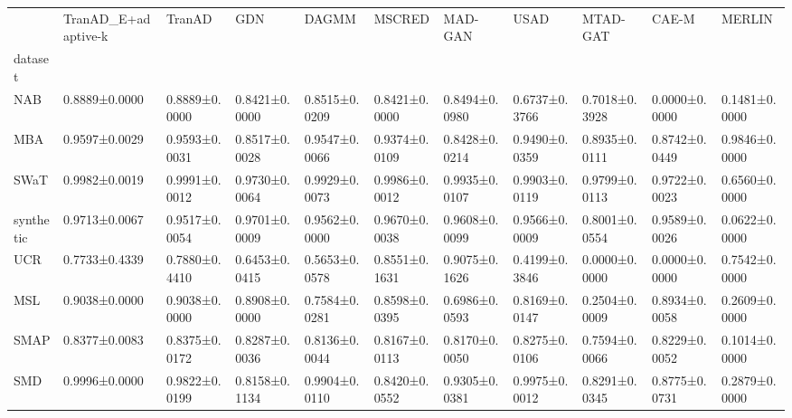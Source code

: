 \begin{tabular}{lllllllllll}
\toprule
 & TranAD_E+adaptive-k & TranAD & GDN & DAGMM & MSCRED & MAD-GAN & USAD & MTAD-GAT & CAE-M & MERLIN \\
dataset &  &  &  &  &  &  &  &  &  &  \\
\midrule
NAB & 0.8889±0.0000 & 0.8889±0.0000 & 0.8421±0.0000 & 0.8515±0.0209 & 0.8421±0.0000 & 0.8494±0.0980 & 0.6737±0.3766 & 0.7018±0.3928 & 0.0000±0.0000 & 0.1481±0.0000 \\
MBA & 0.9597±0.0029 & 0.9593±0.0031 & 0.8517±0.0028 & 0.9547±0.0066 & 0.9374±0.0109 & 0.8428±0.0214 & 0.9490±0.0359 & 0.8935±0.0111 & 0.8742±0.0449 & 0.9846±0.0000 \\
SWaT & 0.9982±0.0019 & 0.9991±0.0012 & 0.9730±0.0064 & 0.9929±0.0073 & 0.9986±0.0012 & 0.9935±0.0107 & 0.9903±0.0119 & 0.9799±0.0113 & 0.9722±0.0023 & 0.6560±0.0000 \\
synthetic & 0.9713±0.0067 & 0.9517±0.0054 & 0.9701±0.0009 & 0.9562±0.0000 & 0.9670±0.0038 & 0.9608±0.0099 & 0.9566±0.0009 & 0.8001±0.0554 & 0.9589±0.0026 & 0.0622±0.0000 \\
UCR & 0.7733±0.4339 & 0.7880±0.4410 & 0.6453±0.0415 & 0.5653±0.0578 & 0.8551±0.1631 & 0.9075±0.1626 & 0.4199±0.3846 & 0.0000±0.0000 & 0.0000±0.0000 & 0.7542±0.0000 \\
MSL & 0.9038±0.0000 & 0.9038±0.0000 & 0.8908±0.0000 & 0.7584±0.0281 & 0.8598±0.0395 & 0.6986±0.0593 & 0.8169±0.0147 & 0.2504±0.0009 & 0.8934±0.0058 & 0.2609±0.0000 \\
SMAP & 0.8377±0.0083 & 0.8375±0.0172 & 0.8287±0.0036 & 0.8136±0.0044 & 0.8167±0.0113 & 0.8170±0.0050 & 0.8275±0.0106 & 0.7594±0.0066 & 0.8229±0.0052 & 0.1014±0.0000 \\
SMD & 0.9996±0.0000 & 0.9822±0.0199 & 0.8158±0.1134 & 0.9904±0.0110 & 0.8420±0.0552 & 0.9305±0.0381 & 0.9975±0.0012 & 0.8291±0.0345 & 0.8775±0.0731 & 0.2879±0.0000 \\
\bottomrule
\end{tabular}


